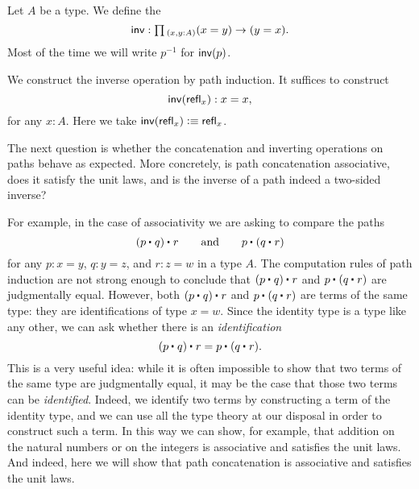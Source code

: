 \begin{defn}\label{defn:id_inv}
Let $A$ be a type. We define the 
\begin{equation*}
\invfunc:\prd{x,y:A} (x=y)\to (y=x).
\end{equation*}
Most of the time we will write $p^{-1}$ for $\mathsf{inv}(p)$.
\end{defn}

\begin{constr}
We construct the inverse operation by path induction. It suffices to construct
\begin{equation*}
\mathsf{inv}(\mathsf{refl}_{x}): x=x,
\end{equation*}
for any $x:A$. Here we take $\mathsf{inv}(\mathsf{refl}_{x})\vcentcolon\equiv \mathsf{refl}_{x}$.
\end{constr}

The next question is whether the concatenation and inverting operations on paths behave as expected. More concretely, is path concatenation associative, does it satisfy the unit laws, and is the inverse of a path indeed a two-sided inverse?

For example, in the case of associativity we are asking to compare the paths
\begin{equation*}
  \ct{(\ct{p}{q})}{r}\qquad\text{and}\qquad\ct{p}{(\ct{q}{r})}
\end{equation*}
for any $p:x=y$, $q:y=z$, and $r:z=w$ in a type $A$. The computation rules of path induction are not strong enough to conclude that $\ct{(\ct{p}{q})}{r}$ and $\ct{p}{(\ct{q}{r})}$ are judgmentally equal. However, both $\ct{(\ct{p}{q})}{r}$ and $\ct{p}{(\ct{q}{r})}$ are terms of the same type: they are identifications of type $x=w$. Since the identity type is a type like any other, we can ask whether there is an \emph{identification}
\begin{equation*}
\ct{(\ct{p}{q})}{r}=\ct{p}{(\ct{q}{r})}.
\end{equation*}
This is a very useful idea: while it is often impossible to show that two terms of the same type are judgmentally equal, it may be the case that those two terms can be \emph{identified}. Indeed, we identify two terms by constructing a term of the identity type, and we can use all the type theory at our disposal in order to construct such a term. In this way we can show, for example, that addition on the natural numbers or on the integers is associative and satisfies the unit laws. And indeed, here we will show that path concatenation is associative and satisfies the unit laws.

